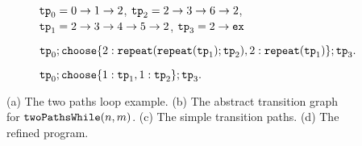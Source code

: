 {\begin{figure}
{\begin{subfigure}{.8\textwidth}
\begin{centering}
    $\mathtt{tp}_0 = 0 \to 1 \to 2$,
    $\mathtt{tp}_2 = 2 \to 3 \to 6 \to 2$, \\
    $\mathtt{tp}_1 = 2 \to 3 \to 4 \to 5 \to 2$,
    $\mathtt{tp}_3 = 2 \to \mathtt{ex}$\footnotemark
    \caption{}
\end{centering}
\end{subfigure}
}
\begin{subfigure}{.8\textwidth}
  \begin{centering}
  $
  \tpath_0 ; 
  \rpchoose{2: \rprepeat(\rprepeat(\tpath_1); \tpath_2), 
  2: \rprepeat(\tpath_1)}; \tpath_3.
  $
  \caption{}
\end{centering}
  \end{subfigure}
{
\begin{subfigure}{.8\textwidth}
\begin{centering}
$
\tpath_0; 
\rpchoose{ 1: \tpath_1, 1: \tpath_2 }; \tpath_3.
$
\end{centering}
\end{subfigure}
}
\caption{
(a) The two paths loop example.
(b) The abstract transition graph for $\mathtt{twoPathsWhile}(n, m)$.
(c) The simple transition paths.
(d) The refined program.}
    \label{fig:whileTwoCounters-overview}
\end{figure}
}

